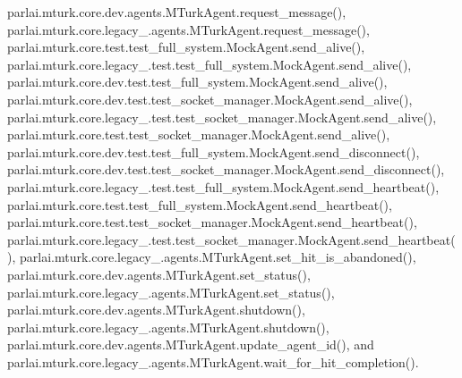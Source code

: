 parlai.\+mturk.\+core.\+dev.\+agents.\+M\+Turk\+Agent.\+request\+\_\+message(), parlai.\+mturk.\+core.\+legacy\+\_.\+agents.\+M\+Turk\+Agent.\+request\+\_\+message(), parlai.\+mturk.\+core.\+test.\+test\+\_\+full\+\_\+system.\+Mock\+Agent.\+send\+\_\+alive(), parlai.\+mturk.\+core.\+legacy\+\_.\+test.\+test\+\_\+full\+\_\+system.\+Mock\+Agent.\+send\+\_\+alive(), parlai.\+mturk.\+core.\+dev.\+test.\+test\+\_\+full\+\_\+system.\+Mock\+Agent.\+send\+\_\+alive(), parlai.\+mturk.\+core.\+dev.\+test.\+test\+\_\+socket\+\_\+manager.\+Mock\+Agent.\+send\+\_\+alive(), parlai.\+mturk.\+core.\+legacy\+\_.\+test.\+test\+\_\+socket\+\_\+manager.\+Mock\+Agent.\+send\+\_\+alive(), parlai.\+mturk.\+core.\+test.\+test\+\_\+socket\+\_\+manager.\+Mock\+Agent.\+send\+\_\+alive(), parlai.\+mturk.\+core.\+dev.\+test.\+test\+\_\+full\+\_\+system.\+Mock\+Agent.\+send\+\_\+disconnect(), parlai.\+mturk.\+core.\+dev.\+test.\+test\+\_\+socket\+\_\+manager.\+Mock\+Agent.\+send\+\_\+disconnect(), parlai.\+mturk.\+core.\+legacy\+\_.\+test.\+test\+\_\+full\+\_\+system.\+Mock\+Agent.\+send\+\_\+heartbeat(), parlai.\+mturk.\+core.\+test.\+test\+\_\+full\+\_\+system.\+Mock\+Agent.\+send\+\_\+heartbeat(), parlai.\+mturk.\+core.\+test.\+test\+\_\+socket\+\_\+manager.\+Mock\+Agent.\+send\+\_\+heartbeat(), parlai.\+mturk.\+core.\+legacy\+\_.\+test.\+test\+\_\+socket\+\_\+manager.\+Mock\+Agent.\+send\+\_\+heartbeat(), parlai.\+mturk.\+core.\+legacy\+\_.\+agents.\+M\+Turk\+Agent.\+set\+\_\+hit\+\_\+is\+\_\+abandoned(), parlai.\+mturk.\+core.\+dev.\+agents.\+M\+Turk\+Agent.\+set\+\_\+status(), parlai.\+mturk.\+core.\+legacy\+\_.\+agents.\+M\+Turk\+Agent.\+set\+\_\+status(), parlai.\+mturk.\+core.\+dev.\+agents.\+M\+Turk\+Agent.\+shutdown(), parlai.\+mturk.\+core.\+legacy\+\_.\+agents.\+M\+Turk\+Agent.\+shutdown(), parlai.\+mturk.\+core.\+dev.\+agents.\+M\+Turk\+Agent.\+update\+\_\+agent\+\_\+id(), and parlai.\+mturk.\+core.\+legacy\+\_.\+agents.\+M\+Turk\+Agent.\+wait\+\_\+for\+\_\+hit\+\_\+completion().

\mbox{\label{classparlai_1_1mturk_1_1core_1_1dev_1_1agents_1_1AbsentAgentError_a469a3b342c2877da0824bc08c0a91c54}} 
